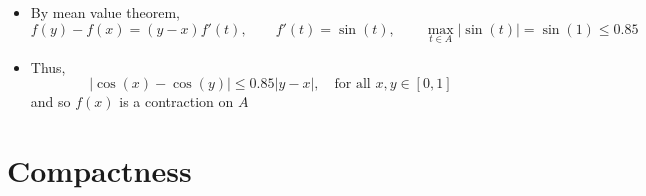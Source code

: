 \documentclass[11pt,twoside]{report}
\begin{document}
\begin{itemize}
\begin{itemize}
\item By mean value theorem, 
\[
f(y) - f(x)  = (y-x) f'(t), \qquad f'(t) = \sin(t) , \qquad \max_{t \in A} |\sin(t)| = \sin(1) \le 0.85
\]
\item Thus, 
\[
| \cos(x) - \cos(y) | \le 0.85 |y - x| , \quad \text{for all $x,y \in [0,1]$}
\]
and so $f(x)$ is a contraction on $A$

\end{itemize}
\begin{center}

\end{center}
  
\end{itemize}


\section{Compactness} 
\end{document}
